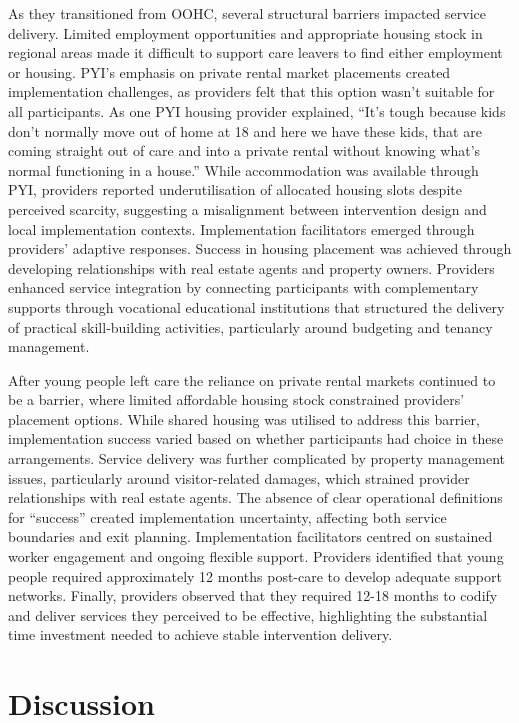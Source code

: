 \documentclass[
  jou,
  floatsintext,
  longtable,
  nolmodern,
  notxfonts,
  notimes,
  colorlinks=true,linkcolor=blue,citecolor=blue,urlcolor=blue]{apa7}
\begin{document}
As they transitioned from OOHC, several structural barriers impacted
service delivery. Limited employment opportunities and appropriate
housing stock in regional areas made it difficult to support care
leavers to find either employment or housing. PYI's emphasis on private
rental market placements created implementation challenges, as providers
felt that this option wasn't suitable for all participants. As one PYI
housing provider explained, ``It's tough because kids don't normally
move out of home at 18 and here we have these kids, that are coming
straight out of care and into a private rental without knowing what's
normal functioning in a house.'' While accommodation was available
through PYI, providers reported underutilisation of allocated housing
slots despite perceived scarcity, suggesting a misalignment between
intervention design and local implementation contexts. Implementation
facilitators emerged through providers' adaptive responses. Success in
housing placement was achieved through developing relationships with
real estate agents and property owners. Providers enhanced service
integration by connecting participants with complementary supports
through vocational educational institutions that structured the delivery
of practical skill-building activities, particularly around budgeting
and tenancy management.

After young people left care the reliance on private rental markets
continued to be a barrier, where limited affordable housing stock
constrained providers' placement options. While shared housing was
utilised to address this barrier, implementation success varied based on
whether participants had choice in these arrangements. Service delivery
was further complicated by property management issues, particularly
around visitor-related damages, which strained provider relationships
with real estate agents. The absence of clear operational definitions
for ``success'' created implementation uncertainty, affecting both
service boundaries and exit planning. Implementation facilitators
centred on sustained worker engagement and ongoing flexible support.
Providers identified that young people required approximately 12 months
post-care to develop adequate support networks. Finally, providers
observed that they required 12-18 months to codify and deliver services
they perceived to be effective, highlighting the substantial time
investment needed to achieve stable intervention delivery.

\section{Discussion}\label{discussion}
\end{document}
